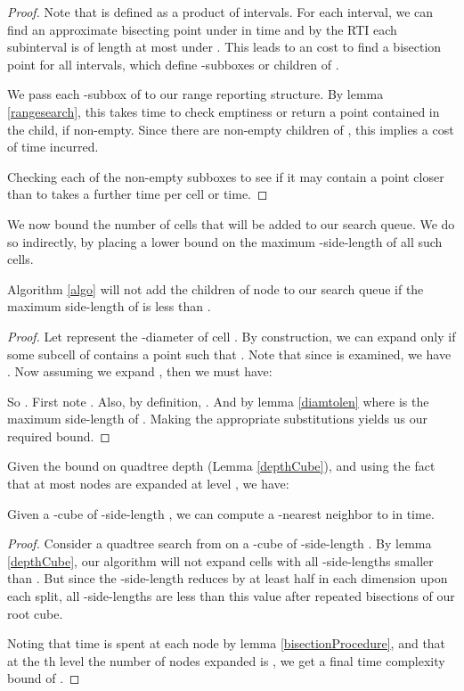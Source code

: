 \documentclass[11pt]{myclass}
\begin{document}
\begin{proof}
 Note that  is defined as a product of  intervals. For each interval, we can find an approximate bisecting point under
 in  time and by the RTI each subinterval is of length at most  under . This leads to an  cost to find a bisection point for all intervals, which define  -subboxes or children of .

We pass each -subbox of  to our range reporting structure. By lemma \ref{rangesearch}, this takes  time to check emptiness or return a point  contained in the child, if non-empty. Since there are  non-empty children of , this implies a cost of  time incurred.

 Checking each of the non-empty subboxes  to see if it may contain a point closer than  to  takes a further  time per cell or  time. 
\end{proof}

We now bound the number of cells that will be added to our search queue. We do so indirectly, by placing a lower bound on the maximum -side-length of all such cells.


\begin{lemma}\label{depthCube}
Algorithm \ref{algo} will not add the children of node   to our search queue 
if the maximum side-length of  is less than .
\end{lemma}

\begin{proof}

Let  represent the -diameter of cell . By construction, 
we can expand  only if some subcell of  contains a point  
such that . Note that since  is 
examined, we have . 
Now assuming we expand , then we must have:


So .
First note . Also, by definition,  . And  by lemma \ref{diamtolen} where  is the maximum side-length of . 
Making the appropriate substitutions yields us our required bound.
\end{proof}

Given the bound on quadtree depth (Lemma \ref{depthCube}), and using the fact that at most  nodes are expanded at level , we have:
\begin{lemma}\label{timeFinal}
Given a -cube  of -side-length , we can compute a -nearest neighbor to  in  time.
\end{lemma}

\begin{proof}
Consider a quadtree search from  on a -cube  of -side-length . By lemma \ref{depthCube}, our algorithm will not 
expand cells with all -side-lengths smaller than  . But since the -side-length reduces by at least half in each dimension upon each split, all -side-lengths are less than this value after 
 repeated bisections of our root cube.

Noting that  time is spent at each node by lemma \ref{bisectionProcedure}, and that at the th level the 
number of nodes expanded is , we get a final time complexity bound of 
. 
\qedhere
\end{proof}
\end{document}
